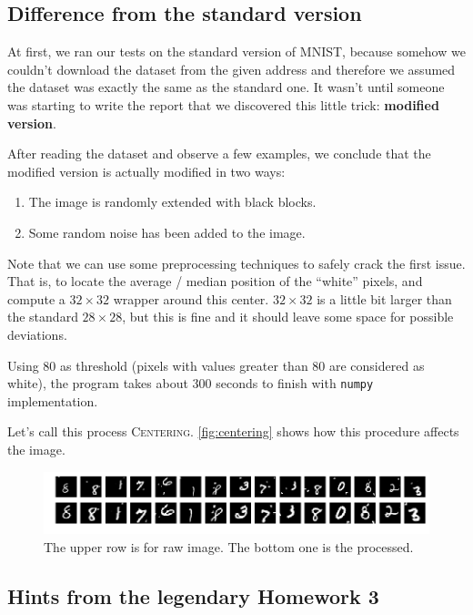 \documentclass[a4paper,10pt,UTF8]{article}
\numberwithin{equation}{section}
\numberwithin{figure}{section}
\begin{document}
\subsection{Difference from the standard version}

At first, we ran our tests on the standard version of MNIST, because somehow we couldn't download the dataset from the given address and therefore we assumed the dataset was exactly the same as the standard one. It wasn't until someone was starting to write the report that we discovered this little trick: \textbf{modified version}.

After reading the dataset and observe a few examples, we conclude that the modified version is actually modified in two ways:

\begin{enumerate}
\item The image is randomly extended with black blocks.
\item Some random noise has been added to the image.
\end{enumerate}

Note that we can use some preprocessing techniques to safely crack the first issue. That is, to locate the average / median position of the ``white'' pixels, and compute a $32 \times 32$ wrapper around this center. $32 \times 32$ is a little bit larger than the standard $28 \times 28$, but this is fine and it should leave some space for possible deviations.

Using 80 as threshold (pixels with values greater than 80 are considered as white), the program takes about 300 seconds to finish with \verb|numpy| implementation.

Let's call this process \textsc{Centering}. \autoref{fig:centering} shows how this procedure affects the image.

\begin{figure}[htbp]
\centering
\includegraphics[width=1.0\textwidth]{img/centralize.png}
\caption{The upper row is for raw image. The bottom one is the processed.}
\label{fig:centering}
\end{figure}

\subsection{Hints from the legendary Homework 3}
\end{document}
